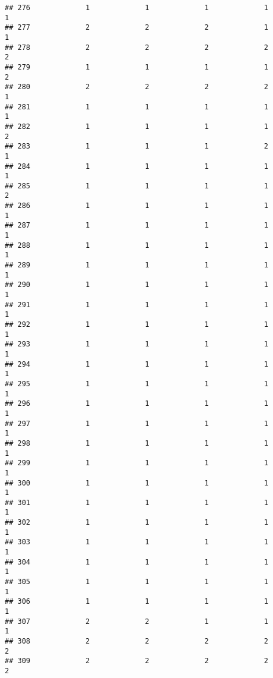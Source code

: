 \documentclass[
]{article}
\begin{document}
\begin{verbatim}
## 276             1             1             1             1             1
## 277             2             2             2             1             1
## 278             2             2             2             2             2
## 279             1             1             1             1             2
## 280             2             2             2             2             1
## 281             1             1             1             1             1
## 282             1             1             1             1             2
## 283             1             1             1             2             1
## 284             1             1             1             1             1
## 285             1             1             1             1             2
## 286             1             1             1             1             1
## 287             1             1             1             1             1
## 288             1             1             1             1             1
## 289             1             1             1             1             1
## 290             1             1             1             1             1
## 291             1             1             1             1             1
## 292             1             1             1             1             1
## 293             1             1             1             1             1
## 294             1             1             1             1             1
## 295             1             1             1             1             1
## 296             1             1             1             1             1
## 297             1             1             1             1             1
## 298             1             1             1             1             1
## 299             1             1             1             1             1
## 300             1             1             1             1             1
## 301             1             1             1             1             1
## 302             1             1             1             1             1
## 303             1             1             1             1             1
## 304             1             1             1             1             1
## 305             1             1             1             1             1
## 306             1             1             1             1             1
## 307             2             2             1             1             1
## 308             2             2             2             2             2
## 309             2             2             2             2             2

\end{verbatim}
\end{document}
